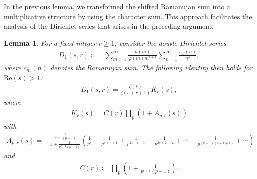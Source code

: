\documentclass[12pt, oneside,reqno]{amsart}
\numberwithin{equation}{section}
\newtheorem{lemma}[theorem]{Lemma}
\begin{document}
In the previous lemma, we transformed the shifted Ramanujan sum into a multiplicative structure by using the character sum. This approach facilitates the analysis of the Dirichlet series that arises in the preceding argument.

\begin{lemma}\label{dsklemma}
For a fixed integer $r\geq 1$, consider the double Dirichlet series
\begin{align}\label{dskdefinition}
D_1(s,r)
\coloneqq &\sum_{m=1}^{\infty}\frac{\mu(m)}{\varphi(m)m^{r+1}}\sum_{n=1}^{\infty}\frac{c_m(n)}{n^s},
\end{align}
where $c_m(n)$ denotes the Ramanujan sum. The following identity then holds for $\mathrm{Re}(s)>1$:
\begin{align*}
D_1(s,r)
=\frac{\zeta(s)}{\zeta(s+r+1)}K_r(s),
\end{align*}
where
\begin{align}\label{arsdefinition}
K_r(s)
=C(r)\prod_{p}\left(1+A_{p,r}(s)\right)
\end{align}
with 
\begin{align*}%
A_{p,r}(s)
=-\frac{\frac{1}{p^{r+1}(p-1)}}{1+\frac{1}{p^{r+1}(p-1)}}\left(\frac{1}{p^s}-\frac{1}{p^{s+r+1}}+\frac{1}{p^{2s+r+1}}-\frac{1}{p^{2s+2r+2}}+\cdots-\frac{1}{p^{(k+1)(s+r+1)}}+\cdots\right)
\end{align*}
and
\begin{align}\label{crdefinition}
C(r)
\coloneqq\prod_{p}\left(1+\frac{1}{p^{r+1}(p-1)}\right).    
\end{align}
\end{lemma}    
\end{document}
